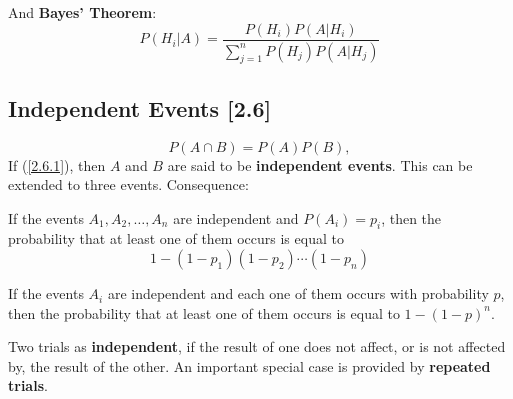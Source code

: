 \documentclass[a4paper,9pt]{extarticle}
\begin{document}
\begin{multicols*}{2}
And \textbf{Bayes' Theorem}:
\begin{equation}
    P(H_i|A) = \frac{P(H_i) P(A|H_i)}{\sum_{j=1}^n P(H_j) P(A|H_j)}
\end{equation}

\subsection{Independent Events [2.6]}
\begin{equation} \label{2.6.1}
    P(A \cap B) = P(A) P(B),
\end{equation}
If (\ref{2.6.1}), then $A$ and $B$ are said to be \textbf{independent events}. This can be extended to three events. Consequence:

If the events $A_1, A_2, \dots, A_n$ are independent and $P(A_i)=p_i$, then the probability that at least one of them occurs is equal to
\begin{equation}
    1 - (1 - p_1)(1 - p_2) \cdots (1 - p_n)
\end{equation}

If the events $A_i$ are independent and each one of them occurs with probability $p$, then the probability that at least one of them occurs is equal to $1 - (1 - p)^n$.

Two trials as \textbf{independent}, if the result of one does not affect, or is not affected by, the result of the other. An important special case is provided by \textbf{repeated trials}.

\end{multicols*}
\end{document}
